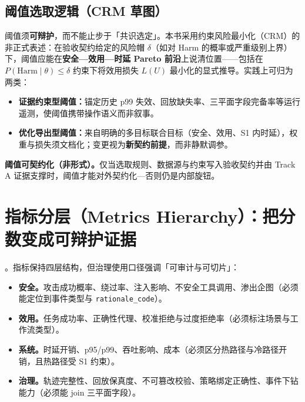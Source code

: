 \documentclass[11pt,a4paper]{report}
\begin{document}
\subsection{阈值选取逻辑（CRM 草图）}
阈值须\textbf{可辩护}，而不能止步于「共识选定」。本书采用约束风险最小化（CRM）的非正式表述：在验收契约给定的风险帽 $\delta$（如对 Harm 的概率或严重级别上界）下，阈值应能在\textbf{安全—效用—时延 Pareto 前沿}上说清位置——包括在 $P(\mathrm{Harm}\mid \theta)\le \delta$ 约束下将效用损失 $L(U)$ 最小化的显式推导。实践上可归为两类：
\begin{itemize}
  \item \textbf{证据约束型阈值：}锚定历史 p99 失效、回放缺失率、三平面字段完备率等运行遥测，使阈值携带操作语义而非叙事。
  \item \textbf{优化导出型阈值：}来自明确的多目标联合目标（安全、效用、S1 内时延），权重与损失须文档化；变更视为\textbf{新契约前提}，而非静默调参。
\end{itemize}
\noindent\textbf{阈值可契约化（非形式）。}仅当选取规则、数据源与约束写入验收契约并由 Track A 证据支撑时，阈值才能对外契约化---否则仍是内部旋钮。

\section{指标分层（Metrics Hierarchy）：把分数变成可辩护证据}
\EvalFramework{}。指标保持四层结构，但治理使用口径强调「可审计与可切片」：
\begin{itemize}
  \item \textbf{安全。}攻击成功概率、绕过率、注入影响、不安全工具调用、渗出企图（必须能定位到事件类型与 \texttt{rationale\_code}）。
  \item \textbf{效用。}任务成功率、正确性代理、校准拒绝与过度拒绝率（必须标注场景与工作流类型）。
  \item \textbf{系统。}时延开销、p95/p99、吞吐影响、成本（必须区分热路径与冷路径开销，且热路径受 S1 约束）。
  \item \textbf{治理。}轨迹完整性、回放保真度、不可篡改校验、策略绑定正确性、事件下钻能力（必须能 join 三平面字段）。
\end{itemize}
\end{document}
